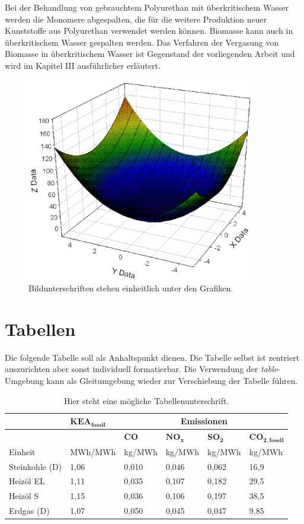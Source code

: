 Bei der Behandlung von gebrauchtem Polyurethan mit überkritischem Wasser werden die Monomere abgespalten, die für die weitere Produktion neuer Kunststoffe aus Polyurethan verwendet werden können. Biomasse kann auch in überkritischem Wasser gespalten werden. Das Verfahren der Vergasung von Biomasse in überkritischem Wasser ist Gegenstand der vorliegenden Arbeit und wird im Kapitel III ausführlicher erläutert. 
\begin{figure}[htb]
	\centering
	\includegraphics[width=10cm]{graphics/example}
	\caption{Bildunterschriften stehen einheitlich unter den Grafiken.}
\end{figure}
\section{Tabellen}
Die folgende Tabelle soll als Anhaltspunkt dienen. Die Tabelle selbst ist zentriert auszurichten aber sonst individuell formatierbar. Die Verwendung der \emph{table}-Umgebung kann als Gleitumgebung wieder zur Verschiebung der Tabelle führen.
\begin{table}[htb]
	\begin{center}
	\footnotesize
		\begin{tabular}{|l|l|l|l|l|l|}
			\hline
			& $\mathbf{KEA_{fossil}}$ & \multicolumn{4}{c|}{\bfseries{Emissionen}} \\ \hline
			& & $\mathbf{CO}$ & $\mathbf{NO_x}$ & $\mathbf{SO_2}$ & $\mathbf{CO_{2,fossil}}$ \\ \hline
			Einheit & MWh/MWh & kg/MWh & kg/MWh & kg/MWh & kg/MWh \\ \hline
			Steinkohle (D) & 1,06 & 0,010 & 0,046 & 0,062 & 16,9 \\ \hline
			Heizöl EL & 1,11 & 0,035 & 0,107 & 0,182 & 29,5 \\ \hline
			Heizöl S & 1,15 & 0,036 & 0,106 & 0,197 & 38,5 \\ \hline
			Erdgas (D) & 1,07 & 0,050 & 0,045 & 0,047 & 9,85 \\ \hline
		\end{tabular}
	\end{center}
	\label{exampletab}
	\caption{Hier steht eine mögliche Tabellenunterschrift.}
\end{table}
